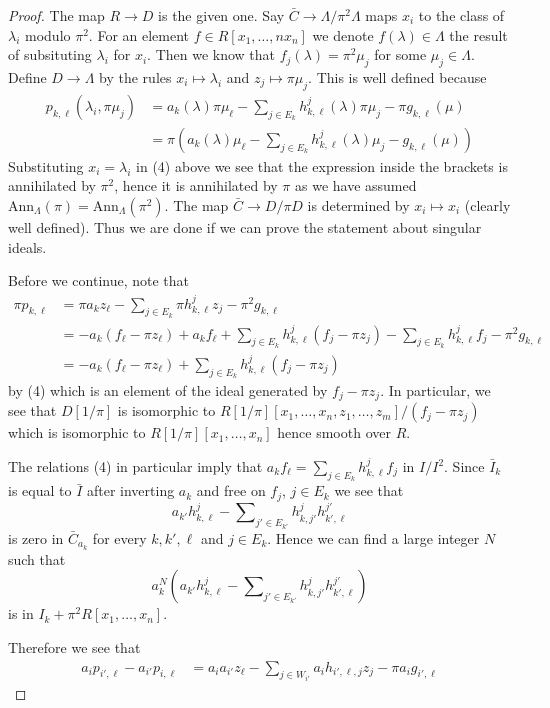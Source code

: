 \begin{proof}
\medskip\noindent
The map $R \to D$ is the given one.
Say $\bar C \to \Lambda/\pi^2\Lambda$ maps $x_i$
to the class of $\lambda_i$ modulo $\pi^2$. For an element
$f \in R[x_1, \ldots, nx_n]$ we denote $f(\lambda) \in \Lambda$
the result of subsituting $\lambda_i$ for $x_i$. Then we know that
$f_j(\lambda) = \pi^2 \mu_j$ for some $\mu_j \in \Lambda$.
Define $D \to \Lambda$ by the rules $x_i \mapsto \lambda_i$ and
$z_j \mapsto \pi\mu_j$. This is well defined because
\begin{align*}
p_{k, \ell}(\lambda_i, \pi \mu_j) & =
a_k(\lambda) \pi \mu_\ell -
\sum\nolimits_{j \in E_k} h_{k, \ell}^j(\lambda) \pi \mu_j
- \pi g_{k, \ell}(\mu) \\
& =
\pi\left(a_k(\lambda) \mu_\ell -
\sum\nolimits_{j \in E_k} h_{k, \ell}^j(\lambda) \mu_j
- g_{k, \ell}(\mu)\right)
\end{align*}
Substituting $x_i = \lambda_i$ in (4) above we see that the expression
inside the brackets is annihilated by $\pi^2$, hence it is annihilated
by $\pi$ as we have assumed
$\text{Ann}_\Lambda(\pi) = \text{Ann}_\Lambda(\pi^2)$.
The map $\bar C \to D/\pi D$ is determined by $x_i \mapsto x_i$
(clearly well defined). Thus we are done if we can prove the statement
about singular ideals.

\medskip\noindent
Before we continue, note that
\begin{align*}
\pi p_{k, \ell} & =
\pi a_k z_\ell - \sum\nolimits_{j \in E_k} \pi h_{k, \ell}^jz_j
- \pi^2 g_{k, \ell} \\
& =
- a_k (f_\ell - \pi z_\ell) + a_k f_\ell +
\sum\nolimits_{j \in E_k} h_{k, \ell}^j (f_j - \pi z_j) -
\sum\nolimits_{j \in E_k} h_{k, \ell}^j f_j - \pi^2 g_{k, \ell} \\
& =
-a_k(f_\ell - \pi z_\ell) +
\sum\nolimits_{j \in E_k} h_{k, \ell}^j(f_j - \pi z_j)
\end{align*}
by (4) which is an element of the ideal generated by $f_j - \pi z_j$.
In particular, we see that $D[1/\pi]$ is isomorphic to
$R[1/\pi][x_1, \ldots, x_n, z_1, \ldots, z_m]/(f_j - \pi z_j)$
which is isomorphic to $R[1/\pi][x_1, \ldots, x_n]$ hence smooth
over $R$.

\medskip\noindent
The relations (4) in particular imply that $a_k f_\ell =
\sum_{j \in E_k} h_{k, \ell}^j f_j$ in $I/I^2$.
Since $\bar I_k$ is equal to $\bar I$
after inverting $a_k$ and free on $f_j$, $j \in E_k$ we see that
$$
a_{k'} h_{k, \ell}^j -
\sum\nolimits_{j' \in E_{k'}} h_{k, j'}^jh_{k', \ell}^{j'}
$$
is zero in $\bar C_{a_k}$ for every $k, k', \ell$ and $j \in E_k$.
Hence we can find a large integer $N$ such that
$$
a_k^N\left(
a_{k'} h_{k, \ell}^j -
\sum\nolimits_{j' \in E_{k'}} h_{k, j'}^jh_{k', \ell}^{j'}
\right)
$$
is in $I_k + \pi^2R[x_1, \ldots, x_n]$.


Therefore we see that
\begin{align*}
a_i p_{i', \ell} - a_{i'}p_{i, \ell}
& =
a_i a_{i'} z_\ell - \sum\nolimits_{j \in W_{i'}} a_i h_{i', \ell, j}z_j
- \pi a_i g_{i', \ell}
\end{align*}




\end{proof}

















